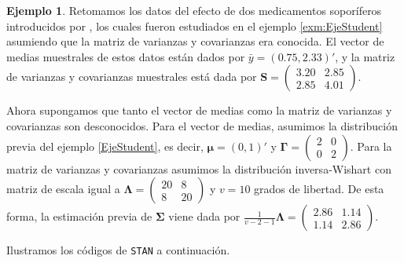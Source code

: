 \documentclass[
  10pt,
  spanish,
]{book}
\theoremstyle{definition}
\theoremstyle{definition}
\newtheorem{example}{Ejemplo}[chapter]
\theoremstyle{definition}
\theoremstyle{definition}
\theoremstyle{remark}
\begin{document}
\begin{example}
\protect\hypertarget{exm:EjeStudent2}{}{\label{exm:EjeStudent2} }Retomamos los datos del efecto de dos medicamentos soporíferos introducidos por \citet{Student}, los cuales fueron estudiados en el ejemplo \ref{exm:EjeStudent} asumiendo que la matriz de varianzas y covarianzas era conocida. El vector de medias muestrales de estos datos están dados por \(\bar{y}=(0.75, 2.33)'\), y la matriz de varianzas y covarianzas muestrales está dada por \(\mathbf{S}=\begin{pmatrix}3.20&2.85\\2.85&4.01\end{pmatrix}\).

Ahora supongamos que tanto el vector de medias como la matriz de varianzas y covarianzas son desconocidos. Para el vector de medias, asumimos la distribución previa del ejemplo \ref{EjeStudent}, es decir, \(\boldsymbol \mu=(0, 1)'\) y \(\boldsymbol \Gamma=\begin{pmatrix}2&0\\0&2\end{pmatrix}\). Para la matriz de varianzas y covarianzas asumimos la distribución inversa-Wishart con matriz de escala igual a \(\boldsymbol \Lambda=\begin{pmatrix}20&8\\8&20\end{pmatrix}\) y \(v=10\) grados de libertad. De esta forma, la estimación previa de \(\boldsymbol \Sigma\) viene dada por \(\frac{1}{v-2-1}\boldsymbol \Lambda=\begin{pmatrix}2.86&1.14\\ 1.14&2.86\end{pmatrix}\).

Ilustramos los códigos de \texttt{STAN} a continuación.
\end{example}
\end{document}
